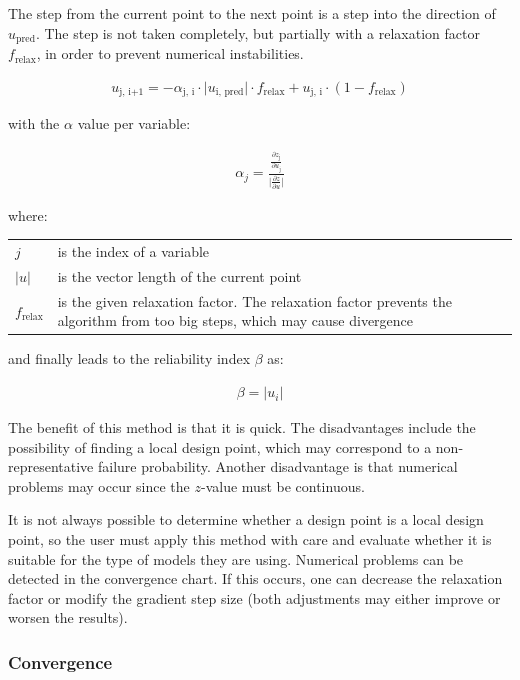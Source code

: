 {The step from the current point to the next point is a step into the direction of $u_{\text{pred}}$. The step is not taken completely, but partially with a relaxation factor $f_{\text{relax}}$, in order to prevent numerical instabilities.

\begin{align}\label{eq:FORM}
u_\text{j, i+1} = - \alpha_\text{j, i} \cdot \lvert  u_\text{i, pred} \rvert \cdot f_\text{relax} + u_\text{j, i} \cdot \left(1 - f_\text{relax}\right)
\end{align}

with the $\alpha$ value per variable:

\begin{align}\label{eq:Alpha}
\alpha_{j} = \frac{\frac{\partial z_\text{j}}{\partial u_\text{j}}}{\lvert \frac{\partial z}{\partial u} \rvert}
\end{align}

where:
\begin{longtable}{p{16mm}p{\textwidth-24pt-16mm}}  
	$j$ & is the index of a variable \\  
	$\lvert u \rvert$ & is the vector length of the current point \\  
	$f_\text{relax}$ & is the given relaxation factor. The relaxation factor prevents the algorithm from too big steps, which may cause divergence \\  	
\end{longtable}

and finally leads to the reliability index $\beta$ as:

\begin{align}
\label{eq:FORMBeta}
\beta = \lvert u_i \rvert
\end{align}

The benefit of this method is that it is quick. The disadvantages include the possibility of finding a local design point, which may correspond to a non-representative failure probability. Another disadvantage is that numerical problems may occur since the $z$-value must be continuous.

It is not always possible to determine whether a design point is a local design point, so the user must apply this method with care and evaluate whether it is suitable for the type of models they are using. Numerical problems can be detected in the convergence chart. If this occurs, one can decrease the relaxation factor or modify the gradient step size (both adjustments may either improve or worsen the results).

\subsubsection{Convergence}

}
